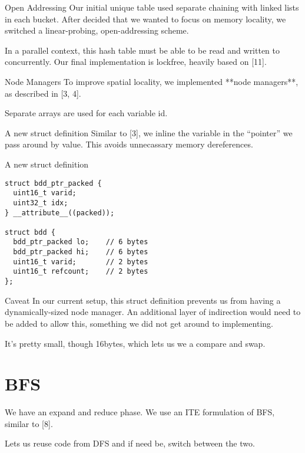 \documentclass{beamer}
\begin{document}
\begin{frame}{Open Addressing}
Our initial unique table used separate chaining with linked lists in each bucket. After decided that we wanted to focus on memory locality, we switched a linear-probing, open-addressing scheme.

In a parallel context, this hash table must be able to be read and written to concurrently. Our final implementation is lockfree, heavily based on [11].
\end{frame}

\begin{frame}{Node Managers}
To improve spatial locality, we implemented **node managers**, as described in [3, 4].

Separate arrays are used for each variable id.
\end{frame}

\begin{frame}{A new struct definition}
Similar to [3], we inline the variable in the ``pointer'' we pass around by value. This avoids unnecassary memory dereferences.
\end{frame}

\begin{frame}{A new struct definition}
\begin{verbatim}
struct bdd_ptr_packed {
  uint16_t varid;
  uint32_t idx;
} __attribute__((packed));

struct bdd {
  bdd_ptr_packed lo;    // 6 bytes
  bdd_ptr_packed hi;    // 6 bytes
  uint16_t varid;       // 2 bytes
  uint16_t refcount;    // 2 bytes
};
\end{verbatim}
\end{frame}

\begin{frame}{Caveat}
In our current setup, this struct definition prevents us from having a dynamically-sized node manager. An additional layer of indirection would need to be added to allow this, something we did not get around to implementing.
\end{frame}

\begin{frame}{It's pretty small, though}
16bytes, which lets us we a compare and swap.
\end{frame}

\section{BFS}

\begin{frame}
We have an expand and reduce phase. We use an ITE formulation of BFS, similar to [8].

Lets us reuse code from DFS and if need be, switch between the two.
\end{frame}
\end{document}
